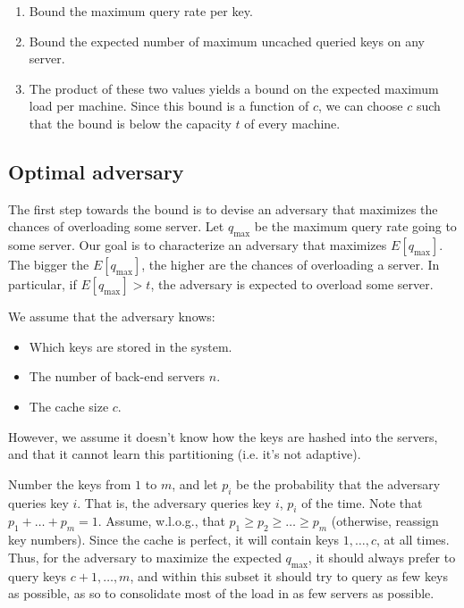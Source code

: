 \documentclass[10pt,letterpaper]{article}
\begin{document}
\begin{enumerate}
	\item Bound the maximum query rate per key.
	\item Bound the expected number of maximum uncached queried keys on any server.
	\item The product of these two values yields a bound on the expected maximum load per machine. Since this bound is a function of $c$, we can choose $c$ such that the bound is below the capacity $t$ of every machine.
\end{enumerate}

\subsection{Optimal adversary}

The first step towards the bound is to devise an adversary that maximizes the chances of overloading some server. Let $q_{\max}$ be the maximum query rate going to some server. Our goal is to characterize an adversary that maximizes $E[q_{\max}]$. The bigger the $E[q_{\max}]$, the higher are the chances of overloading a server. In particular, if $E[q_{\max}] > t$, the adversary is expected to overload some server.

We assume that the adversary knows:
\begin{itemize}
	\item Which keys are stored in the system.
	\item The number of back-end servers $n$.
	\item The cache size $c$.
\end{itemize}

\noindent
However, we assume it doesn't know how the keys are hashed into the servers, and that it cannot learn this partitioning (i.e. it's not adaptive).

Number the keys from $1$ to $m$, and let $p_i$ be the probability that the adversary queries key $i$. That is, the adversary queries key $i$, $p_i$ of the time. Note that $p_1 + \dots + p_m = 1$. Assume, w.l.o.g., that $p_1 \geq p_2 \geq \dots \geq p_m$ (otherwise, reassign key numbers). Since the cache is perfect, it will contain keys $1, \dots, c$, at all times. Thus, for the adversary to maximize the expected $q_{\max}$, it should always prefer to query keys $c + 1, \dots, m$, and within this subset it should try to query as few keys as possible, as so to consolidate most of the load in as few servers as possible.
\end{document}
